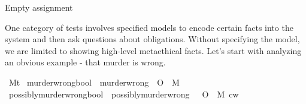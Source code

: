 \begin{isabellebody}
{  Empty assignment \color{black}%
}\isanewline
%
\isanewline
%
\endisatagproof
{\isafoldproof}%
%
\isadelimproof
%
\endisadelimproof
%
\isadelimproof
%
\endisadelimproof
%
\isatagproof
%
\endisatagproof
{\isafoldproof}%
%
\isadelimproof
%
\endisadelimproof
%
\isadelimproof
%
\endisadelimproof
%
\isatagproof
%
\endisatagproof
{\isafoldproof}%
%
\isadelimproof
%
\endisadelimproof
%
\isadelimproof
%
\endisadelimproof
%
\isatagproof
%
\endisatagproof
{\isafoldproof}%
%
\isadelimproof
%
\endisadelimproof
%
\isadelimproof
%
\endisadelimproof
%
\isatagproof
%
\endisatagproof
{\isafoldproof}%
%
\isadelimproof
%
\endisadelimproof
%
\isadelimdocument
%
\endisadelimdocument
%
\isatagdocument
%
\isamarkuptrue%
%
\endisatagdocument
{\isafolddocument}%
%
\isadelimdocument
%
\endisadelimdocument
%
\begin{isamarkuptext}%
One category of tests involves specified models to encode certain facts 
into the system and then ask questions about obligations. Without specifying the model, we are limited 
to showing high-level metaethical facts. Let's start with analyzing an obvious example - that murder is 
wrong.%
\end{isamarkuptext}\isamarkuptrue%
\isamarkupfalse%
\ M{\isacharcolon}{\isacharcolon}{\isachardoublequoteopen}t{\isachardoublequoteclose}\isanewline
{}\isamarkupfalse%
\ murder{\isacharunderscore}wrong{\isacharcolon}{\isacharcolon}{\isachardoublequoteopen}bool{\isachardoublequoteclose}\ \ {\isachardoublequoteopen}murder{\isacharunderscore}wrong\ {\isasymequiv}\ {\isasymTurnstile}{\isacharparenleft}O\ {\isacharbraceleft}\isactrlbold {\isasymnot}\ M{\isacharbraceright}{\isacharparenright}{\isachardoublequoteclose}\isanewline
%
\isadelimproof
%
\endisadelimproof
%
\isatagproof
%
\endisatagproof
{\isafoldproof}%
%
\isadelimproof
\isanewline
%
\endisadelimproof
{}\isamarkupfalse%
\ possibly{\isacharunderscore}murder{\isacharunderscore}wrong{\isacharcolon}{\isacharcolon}{\isachardoublequoteopen}bool{\isachardoublequoteclose}\ \ {\isachardoublequoteopen}possibly{\isacharunderscore}murder{\isacharunderscore}wrong\ {\isasymequiv}\ {\isacharparenleft}{\isasymdiamond}\ {\isacharparenleft}O\ {\isacharbraceleft}\isactrlbold {\isasymnot}\ M{\isacharbraceright}{\isacharparenright}{\isacharparenright}\ cw{\isachardoublequoteclose}\isanewline

\end{isabellebody}
